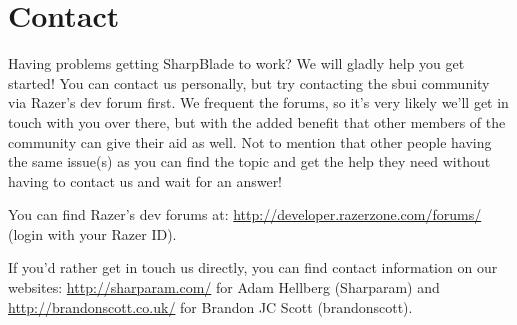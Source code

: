 \chapter{Contact\label{chap:contact}}
Having problems getting SharpBlade to work? We will gladly help you get started! You can contact us personally, but try contacting the \gls{sbui} community via Razer's dev forum first. We frequent the forums, so it's very likely we'll get in touch with you over there, but with the added benefit that other members of the community can give their aid as well. Not to mention that other people having the same issue(s) as you can find the topic and get the help they need without having to contact us and wait for an answer!

You can find Razer's dev forums at: \url{http://developer.razerzone.com/forums/} (login with your Razer ID).

If you'd rather get in touch us directly, you can find contact information on our websites: \url{http://sharparam.com/} for Adam Hellberg (Sharparam) and \url{http://brandonscott.co.uk/} for Brandon JC Scott (brandonscott).
